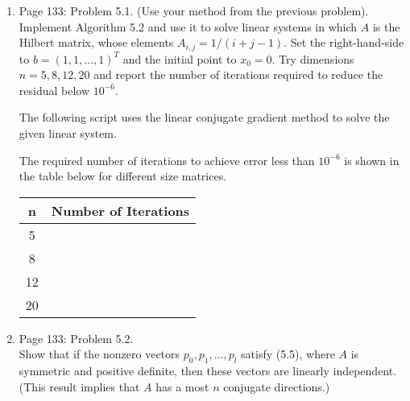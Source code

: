 \documentclass[11pt, oneside]{article}
\begin{document}
\begin{enumerate}
  \item %
    Page 133: Problem 5.1. (Use your method from the previous problem). \\
    Implement Algorithm 5.2 and use it to solve linear systems in which $A$
    is the Hilbert matrix, whose elements $A_{i, j} = 1/(i + j - 1)$.
    Set the right-hand-side to $b = (1, 1, \ldots, 1)^T$ and the initial point
    to $x_0 = 0$.
    Try dimensions $n = 5, 8, 12, 20$ and report the number of iterations
    required to reduce the residual below $10^{-6}$.

    The following script uses the linear conjugate gradient method to solve the
    given linear system.
    

    The required number of iterations to achieve error less than $10^{-6}$ is
    shown in the table below for different size matrices.
    \begin{center}
      \begin{tabular}{cc}
        \toprule
           n & Number of Iterations \\
        \midrule
           5 &  \\
           8 &  \\
          12 &  \\
          20 &  \\
        \bottomrule
      \end{tabular}
    \end{center}

  \item %
    Page 133: Problem 5.2. \\
    Show that if the nonzero vectors $p_0, p_1, \ldots, p_l$ satisfy (5.5),
    where $A$ is symmetric and positive definite, then these vectors are
    linearly independent.
    (This result implies that $A$ has a most $n$ conjugate directions.)


\end{enumerate}
\end{document}

